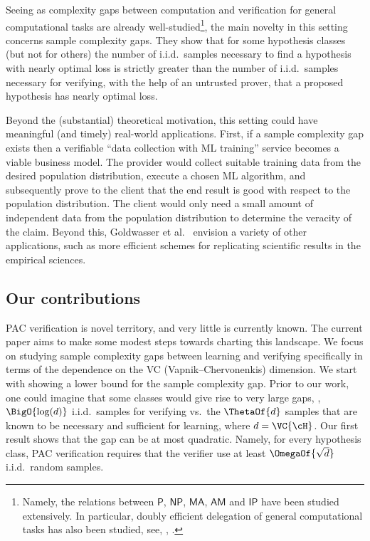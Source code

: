 \documentclass{toc}
\begin{document}
Seeing as complexity gaps between computation and verification for general 
computational %
tasks %
are already well-studied\footnote{
  Namely, the relations between $\mathsf{P}$, $\mathsf{NP}$, $\mathsf{MA}$, $\mathsf{AM}$ and $\mathsf{IP}$ have been studied extensively. In particular, doubly efficient delegation of general computational tasks has also been studied,
%
see, \eg,  %
\cite{DBLP:journals/jacm/GoldwasserKR15}.
}, the main novelty in this setting concerns sample complexity gaps. They show that for some hypothesis classes (but not for others) the number of i.i.d.\ samples necessary to find a hypothesis with nearly optimal loss is strictly greater than the number of i.i.d.\ samples necessary for verifying, with the help of an untrusted prover, that a proposed hypothesis has nearly optimal loss.

Beyond the (substantial) theoretical motivation, this setting could have meaningful (and timely) real-world applications. First, if a sample complexity gap exists then a verifiable ``data collection with ML training'' service becomes a viable  business model. The provider would collect suitable training data from the desired population distribution, execute a chosen ML algorithm, and subsequently prove to the client that the end result is good with respect to the population distribution. The client would only need a small amount of independent data from the population distribution to determine the veracity of the claim. Beyond this, Goldwasser et al.\ \cite{GoldwasserRSY21} envision a variety of other applications, such as more efficient schemes for replicating scientific results in the empirical sciences.

\subsection{Our contributions}

PAC verification is novel territory, and very little is currently known. The current paper aims to make some modest steps towards charting this landscape. We focus on studying sample complexity gaps between learning and verifying specifically in terms of the dependence on the VC (Vapnik--Chervonenkis) dimension. 
We start with showing a lower bound for the sample complexity gap. Prior to our work, one could imagine that some classes would give rise to very large gaps, \eg, $\BigO{\log(d)}$ i.i.d.\ samples for verifying vs.\ the $\ThetaOf{d}$ samples that are known to be necessary and sufficient for learning, where $d = \VC{\cH}$. Our first result shows that the gap can be at most quadratic. Namely, for every hypothesis class, PAC verification requires that the verifier use at least $\OmegaOf{\sqrt{d}}$ i.i.d.\ random samples.
\end{document}

